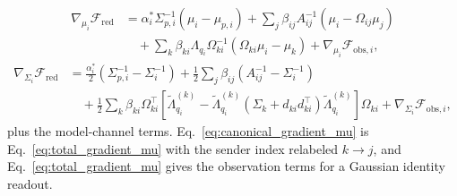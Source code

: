 \documentclass[11pt]{article}
\begin{document}
\begin{equation}
\begin{aligned}
\nabla_{\mu_i}\mathcal{F}_{\mathrm{red}} &= \alpha_i^*\Sigma_{p,i}^{-1}(\mu_i - \mu_{p,i}) + \sum_j \beta_{ij}A_{ij}^{-1}(\mu_i - \Omega_{ij}\mu_j) \\
&\quad + \sum_k \beta_{ki}\Lambda_{q_i}\Omega_{ki}^{-1}\left(\Omega_{ki}\mu_i - \mu_k\right) + \nabla_{\mu_i}\mathcal{F}_{\mathrm{obs},i},
\end{aligned}
\label{eq:canonical_gradient_mu}
\end{equation}
\begin{equation}
\begin{aligned}
\nabla_{\Sigma_i}\mathcal{F}_{\mathrm{red}} &= \frac{\alpha_i^*}{2}\left(\Sigma_{p,i}^{-1} - \Sigma_i^{-1}\right) + \frac{1}{2}\sum_j \beta_{ij}\left(A_{ij}^{-1} - \Sigma_i^{-1}\right) \\
&\quad + \frac{1}{2}\sum_k \beta_{ki}\Omega_{ki}^{\top}\left[\tilde{\Lambda}_{q_i}^{(k)} - \tilde{\Lambda}_{q_i}^{(k)}\left(\Sigma_k + d_{ki}d_{ki}^{\top}\right)\tilde{\Lambda}_{q_i}^{(k)}\right]\Omega_{ki} + \nabla_{\Sigma_i}\mathcal{F}_{\mathrm{obs},i},
\end{aligned}
\label{eq:canonical_gradient_sigma}
\end{equation}
plus the model-channel terms. Eq.~\eqref{eq:canonical_gradient_mu} is Eq.~\eqref{eq:total_gradient_mu} with the sender index relabeled $k \to j$, and Eq.~\eqref{eq:total_gradient_mu} gives the observation terms for a Gaussian identity readout.
\end{document}
